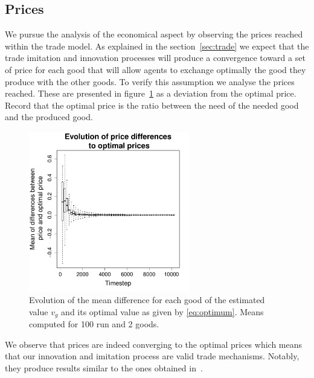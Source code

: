\documentclass{wscpaperproc}
\begin{document}
\subsection{Prices}

We pursue the analysis of the economical aspect by observing the prices reached within the trade model. As explained in the section~\ref{sec:trade} we expect that the trade imitation and innovation processes will produce a convergence toward a set of price for each good that will allow agents to exchange optimally the good they produce with the other goods. To verify this assumption we analyse the prices reached. These are presented in figure~\ref{fig:ratioEvol} as a deviation from the optimal price. Record that the optimal price is the ratio between the need of the needed good and the produced good.

\begin{figure}[H]
	\begin{center}
		\includegraphics[width=7cm]{img/ClearingPriceDistanceEvolutionForTrade-G2N500.pdf}
	\end{center}
	\caption{Evolution of the mean difference for each good of the estimated value $v_g$ and its optimal value as given by \ref{eq:optimum}. Means computed for 100 run and 2 goods. }
	\label{fig:ratioEvol}
\end{figure}

We observe that prices are indeed converging to the optimal prices which means that our innovation and imitation process are valid trade mechanisms. Notably, they produce results similar to the ones obtained in~.
\end{document}

